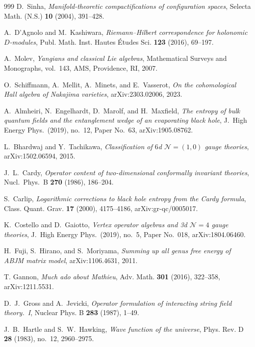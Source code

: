 \begin{thebibliography}{999}
D.~Sinha, \emph{Manifold-theoretic compactifications of configuration spaces}, Selecta Math. (N.S.) \textbf{10} (2004), 391--428.

A.~D'Agnolo and M.~Kashiwara, \emph{Riemann--Hilbert correspondence for holonomic $D$-modules}, Publ. Math. Inst. Hautes \'Etudes Sci. \textbf{123} (2016), 69--197.

A.~Molev, \emph{Yangians and classical Lie algebras}, Mathematical Surveys and Monographs, vol.~143, AMS, Providence, RI, 2007.

O.~Schiffmann, A.~Mellit, A.~Minets, and E.~Vasserot, \emph{On the cohomological Hall algebra of Nakajima varieties}, arXiv:2303.02006, 2023.


A.~Almheiri, N.~Engelhardt, D.~Marolf, and H.~Maxfield, \emph{The entropy of bulk quantum fields and the entanglement wedge of an evaporating black hole}, J.\ High Energy Phys.\ (2019), no.~12, Paper No.~63, arXiv:1905.08762.

L.~Bhardwaj and Y.~Tachikawa, \emph{Classification of $6$d $\mathcal{N}=(1,0)$ gauge theories}, arXiv:1502.06594, 2015.

J.~L.~Cardy, \emph{Operator content of two-dimensional conformally invariant theories}, Nucl.\ Phys.\ B \textbf{270} (1986), 186--204.

S.~Carlip, \emph{Logarithmic corrections to black hole entropy from the Cardy formula}, Class. Quant. Grav. \textbf{17} (2000), 4175--4186, arXiv:gr-qc/0005017.

K.~Costello and D.~Gaiotto, \emph{Vertex operator algebras and 3d $\mathcal{N}=4$ gauge theories}, J.\ High Energy Phys.\ (2019), no.~5, Paper No.~018, arXiv:1804.06460.

H.~Fuji, S.~Hirano, and S.~Moriyama, \emph{Summing up all genus free energy of ABJM matrix model}, arXiv:1106.4631, 2011.

T. Gannon, \emph{Much ado about Mathieu}, Adv. Math. \textbf{301} (2016), 322--358, arXiv:1211.5531.

D.~J.~Gross and A.~Jevicki, \emph{Operator formulation of interacting string field theory.~I}, Nuclear Phys. B \textbf{283} (1987), 1--49.

J.~B.~Hartle and S.~W.~Hawking, \emph{Wave function of the universe}, Phys. Rev. D \textbf{28} (1983), no.~12, 2960--2975.


\end{thebibliography}
